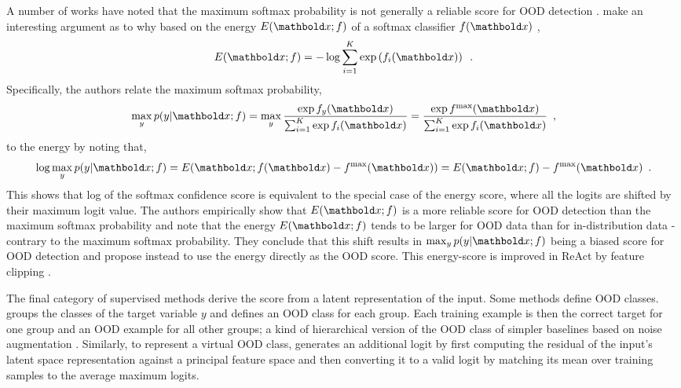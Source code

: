 A number of works have noted that the maximum softmax probability is not generally a reliable score for OOD detection \cite{hendrycks_scaling_2022,liu_energy-based_2020}. 
\textcite{liu_energy-based_2020} make an interesting argument as to why based on the energy $E(\xb; f)$ of a softmax classifier $f(\xb)$ \cite{lecun_tutorial_2006},
%
\begin{equation} \label{eq:softmax-classifier-energy}
    E(\xb; f) = - \log \sum_{i=1}^K \exp \left( f_i(\xb) \right) \enspace .
\end{equation}
%
Specifically, the authors relate the maximum softmax probability,
%
\begin{align} \label{eq:softmax-classifier-maximum-probability}
    \max_y p(y|\xb;f) 
    = \max_y \frac{\exp f_y(\xb)}{\sum_{i=1}^K \exp f_i(\xb)} 
    = \frac{\exp f^\text{max}(\xb)}{\sum_{i=1}^K \exp f_i(\xb)} \enspace ,
\end{align}
%
to the energy by noting that,
%
\begin{align}
    \log \max_y p(y|\xb;f) = E(\xb; f(\xb) - f^\text{max}(\xb)) = E(\xb; f) - f^\text{max}(\xb) \enspace .
\end{align}
%
This shows that log of the softmax confidence score is equivalent to the special case of the energy score, where all the logits are shifted by their maximum logit value. 
The authors empirically show that $E(\xb;f)$ is a more reliable score for OOD detection than the maximum softmax probability and note that the energy $E(\xb; f)$ tends to be larger for OOD data than for in-distribution data - contrary to the maximum softmax probability.
They conclude that this shift results in $\max_y p(y|\xb;f)$ being a biased score for OOD detection and propose instead to use the energy directly as the OOD score. This energy-score is improved in ReAct by feature clipping \cite{sun_react_2021}. 

The final category of supervised methods derive the score from a latent representation of the input. 
Some methods define OOD classes. \textcite{huang_mos_2021} groups the classes of the target variable $y$ and defines an OOD class for each group. Each training example is then the correct target for one group and an OOD example for all other groups; a kind of hierarchical version of the OOD class of simpler baselines based on noise augmentation \cite{ren_likelihood_2019}. 
Similarly, to represent a virtual OOD class, \textcite{wang_vim_2022} generates an additional logit by first computing the residual of the input's latent space representation against a principal feature space and then converting it to a valid logit by matching its mean over training samples to the average maximum logits. 

